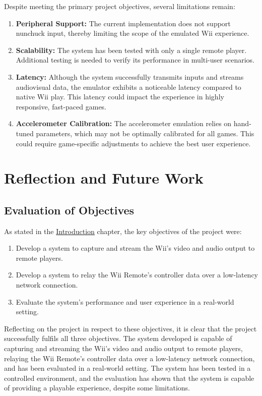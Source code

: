 Despite meeting the primary project objectives, several limitations remain:

\begin{enumerate}
    \item \textbf{Peripheral Support:}
          The current implementation does not support nunchuck input, thereby limiting the scope of the emulated Wii experience.
    \item \textbf{Scalability:}
          The system has been tested with only a single remote player. Additional testing is needed to verify its performance in multi-user scenarios.
    \item \textbf{Latency:}
          Although the system successfully transmits inputs and streams audiovisual data, the emulator exhibits a noticeable latency compared to native Wii play. This latency could impact the experience in highly responsive, fast-paced games.
    \item \textbf{Accelerometer Calibration:}
          The accelerometer emulation relies on hand-tuned parameters, which may not be optimally calibrated for all games. This could require game-specific adjustments to achieve the best user experience.
\end{enumerate}

\section{Reflection and Future Work}

\subsection*{Evaluation of Objectives}
As stated in the \hyperlink{chapter:introduction}{Introduction} chapter, the key objectives of the project were:

\begin{enumerate}
\item  Develop a system to capture and stream the Wii’s video and audio output to remote players.
\item Develop a system to relay the Wii Remote’s controller data over a low-latency network connection.
\item Evaluate the system’s performance and user experience in a real-world setting.
\end{enumerate}

Reflecting on the project in respect to these objectives, it is clear that the project successfully fulfils all three objectives. The system developed is capable of capturing and streaming the Wii’s video and audio output to remote players, relaying the Wii Remote’s controller data over a low-latency network connection, and has been evaluated in a real-world setting. The system has been tested in a controlled environment, and the evaluation has shown that the system is capable of providing a playable experience, despite some limitations.

